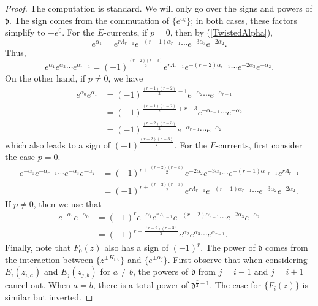 \documentclass{amsart}
\newcommand{\ddd}{\mathfrak{d}}
\theoremstyle{remark}
\newtheorem{rem}[thm]{Remark}
\numberwithin{thm}{section}
\numberwithin{equation}{section}
\begin{document}
\begin{proof}
The computation is standard.
We will only go over the signs and powers of $\ddd$.
The sign comes from the commutation of $\{e^{\alpha_i}\}$; in both cases, these factors simplify to $\pm e^0$.
For the $E$-currents, if $p=0$, then by (\ref{TwistedAlpha}),
\[e^{\alpha_1}= e^{r\Lambda_{r-1}}e^{-(r-1)\alpha_{r-1}}\cdots e^{-3\alpha_3}e^{-2\alpha_2}.\]
Thus,
\[
e^{\alpha_1}e^{\alpha_2}\cdots e^{\alpha_{r-1}}=(-1)^{\frac{(r-2)(r-3)}{2}}e^{r\Lambda_{r-1}}e^{-(r-2)\alpha_{r-1}}\cdots e^{-2\alpha_3}e^{-\alpha_2}.
\]
On the other hand, if $p\not=0$, we have
\begin{align*}
e^{\alpha_0}e^{\alpha_1}&= (-1)^{\frac{(r-1)(r-2)}{2}-1}e^{-\alpha_2}\cdots e^{-\alpha_{r-1}}\\
&=(-1)^{\frac{(r-1)(r-2)}{2}+r-3}e^{-\alpha_{r-1}}\cdots e^{-\alpha_{2}}\\
&= (-1)^{\frac{(r-2)(r-3)}{2}}e^{-\alpha_{r-1}}\cdots e^{-\alpha_{2}}
\end{align*}
which also leads to a sign of $(-1)^{\frac{(r-2)(r-3)}{2}}$.
For the $F$-currents, first consider the case $p=0$.
\begin{align*}
e^{-\alpha_0}e^{-\alpha_{r-1}}\cdots e^{-\alpha_3}e^{-\alpha_2}&= (-1)^{r+\frac{(r-2)(r-3)}{2}}e^{-2\alpha_2}e^{-3\alpha_3}\cdots e^{-(r-1)\alpha_{-r-1}}e^{r\Lambda_{r-1}}\\
&= (-1)^{r+\frac{(r-2)(r-3)}{2}}e^{r\Lambda_{r-1}}e^{-(r-1)\alpha_{r-1}}\cdots e^{-3\alpha_2}e^{-2\alpha_2}.
\end{align*}
If $p\not=0$, then we use that
\begin{align*}
e^{-\alpha_1}e^{-\alpha_0}&=(-1)^re^{-\alpha_1}e^{r\Lambda_{r-1}}e^{-(r-2)\alpha_{r-1}}\cdots e^{-2\alpha_3}e^{-\alpha_2}\\
&= (-1)^{r+\frac{(r-2)(r-3)}{2}}e^{\alpha_2}e^{\alpha_3}\cdots e^{\alpha_{r-1}}.
\end{align*}
Finally, note that $F_0(z)$ also has a sign of $(-1)^{r}$.
The power of $\ddd$ comes from the interaction between $\{z^{\pm H_{i,0}}\}$ and $\{e^{\pm\alpha_{j}}\}$.
First observe that when considering $E_i(z_{i,a})$ and $E_{j}(z_{j,b})$ for $a\not=b$, the powers of $\ddd$ from $j=i-1$ and $j=i+1$ cancel out.
When $a=b$, there is a total power of $\ddd^{\frac{r}{2}-1}$.
The case for $\{F_i(z)\}$ is similar but inverted.
\end{proof}
%
\end{document}
